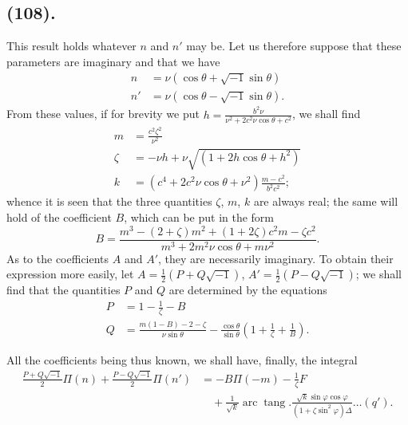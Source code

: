\documentclass{article}
\begin{document}
\subsection*{(108).}

This result holds whatever $n$ and $n'$ may be. Let us therefore suppose that these parameters are imaginary and that we have
\[ \begin{aligned} n&=\nu(\cos\theta+\sqrt{-1}\sin\theta)\\ n'&=\nu(\cos\theta-\sqrt{-1}\sin\theta). \end{aligned} \]
From these values, if for brevity we put $h=\frac{b^{2}\nu}{\nu^{2}+2c^{2}\nu\cos\theta+c^{2}}$, we shall find
\[ \begin{aligned} m&=\frac{c^{2}\zeta^{2}}{\nu^{2}}\\ \zeta&=-\nu h+\nu\sqrt{(1+2h\cos\theta+h^{2})}\\ k&=(c^{4}+2c^{2}\nu\cos\theta+\nu^{2})\frac{m-c^{2}}{b^{2}c^{2}}; \end{aligned} \]
whence it is seen that the three quantities $\zeta$, $m$, $k$ are always real; the same will hold of the coefficient $B$, which can be put in the form
\[ B=\frac{m^{3}-(2+\zeta)m^{2}+(1+2\zeta)c^{2}m-\zeta c^{2}}{m^{3}+2m^{2}\nu\cos\theta+m\nu^{2}}. \]
As to the coefficients $A$ and $A'$, they are necessarily imaginary. To obtain their expression more easily, let $A=\frac{1}{2}(P+Q\sqrt{-1})$, $A'=\frac{1}{2}(P-Q\sqrt{-1})$; we shall find that the quantities $P$ and $Q$ are determined by the equations
\[ \begin{aligned} P&=1-\frac{1}{\zeta}-B\\ Q&=\frac{m(1-B)-2-\zeta}{\nu\sin\theta}-\frac{\cos\theta}{\sin\theta}\left(1+\frac{1}{\zeta}+\frac{1}{B}\right). \end{aligned} \]

All the coefficients being thus known, we shall have, finally, the integral
\[ \begin{aligned} \frac{P+Q\sqrt{-1}}{2}\Pi(n)+\frac{P-Q\sqrt{-1}}{2}\Pi(n')&=-B\Pi(-m)-\frac{1}{\zeta}F\\ &\quad+\frac{1}{\sqrt{k}}\operatorname{arc}\operatorname{tang}.\frac{\sqrt{k}\sin\varphi\cos\varphi}{(1+\zeta\sin^{2}\varphi)\Delta}\ldots(q'). \end{aligned} \]
\end{document}

